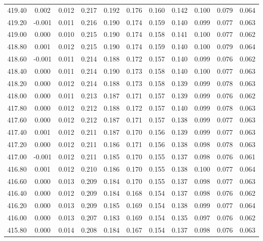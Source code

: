 \begin{longtable}{cccccccccc}
    419.40 &  0.002 &  0.012 &  0.217 &  0.192 &  0.176 &  0.160 &  0.142 &  0.100 &  0.079 &  0.064 \\
    419.20 & -0.001 &  0.011 &  0.216 &  0.190 &  0.174 &  0.159 &  0.140 &  0.099 &  0.077 &  0.063 \\
    419.00 &  0.000 &  0.010 &  0.215 &  0.190 &  0.174 &  0.158 &  0.141 &  0.100 &  0.077 &  0.062 \\
    418.80 &  0.001 &  0.012 &  0.215 &  0.190 &  0.174 &  0.159 &  0.140 &  0.100 &  0.079 &  0.064 \\
    418.60 & -0.001 &  0.011 &  0.214 &  0.188 &  0.172 &  0.157 &  0.140 &  0.099 &  0.076 &  0.062 \\
    418.40 &  0.000 &  0.011 &  0.214 &  0.190 &  0.173 &  0.158 &  0.140 &  0.100 &  0.077 &  0.063 \\
    418.20 &  0.000 &  0.012 &  0.214 &  0.188 &  0.173 &  0.158 &  0.139 &  0.099 &  0.078 &  0.063 \\
    418.00 &  0.000 &  0.011 &  0.213 &  0.187 &  0.171 &  0.157 &  0.139 &  0.099 &  0.076 &  0.062 \\
    417.80 &  0.000 &  0.012 &  0.212 &  0.188 &  0.172 &  0.157 &  0.140 &  0.099 &  0.078 &  0.063 \\
    417.60 &  0.000 &  0.012 &  0.212 &  0.187 &  0.171 &  0.157 &  0.138 &  0.099 &  0.077 &  0.063 \\
    417.40 &  0.001 &  0.012 &  0.211 &  0.187 &  0.170 &  0.156 &  0.139 &  0.099 &  0.077 &  0.063 \\
    417.20 &  0.000 &  0.012 &  0.211 &  0.186 &  0.171 &  0.156 &  0.138 &  0.098 &  0.078 &  0.063 \\
    417.00 & -0.001 &  0.012 &  0.211 &  0.185 &  0.170 &  0.155 &  0.137 &  0.098 &  0.076 &  0.061 \\
    416.80 &  0.001 &  0.012 &  0.210 &  0.186 &  0.170 &  0.155 &  0.138 &  0.100 &  0.077 &  0.064 \\
    416.60 &  0.000 &  0.013 &  0.209 &  0.184 &  0.170 &  0.155 &  0.137 &  0.098 &  0.077 &  0.063 \\
    416.40 &  0.000 &  0.012 &  0.209 &  0.184 &  0.168 &  0.154 &  0.137 &  0.098 &  0.076 &  0.062 \\
    416.20 &  0.000 &  0.013 &  0.209 &  0.185 &  0.169 &  0.154 &  0.138 &  0.099 &  0.077 &  0.064 \\
    416.00 &  0.000 &  0.013 &  0.207 &  0.183 &  0.169 &  0.154 &  0.135 &  0.097 &  0.076 &  0.062 \\
    415.80 &  0.000 &  0.014 &  0.208 &  0.184 &  0.167 &  0.154 &  0.137 &  0.098 &  0.076 &  0.063 \\

\end{longtable}

